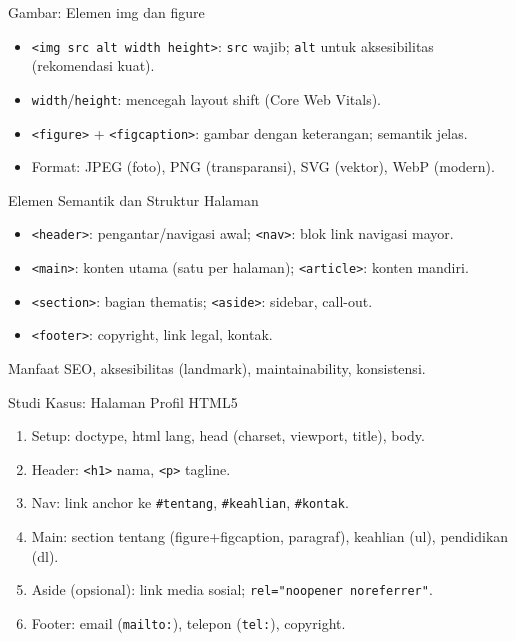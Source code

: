 \documentclass[handout]{beamer}
\begin{document}
\begin{frame}{Gambar: Elemen img dan figure}
	\begin{itemize}
		\item \texttt{<img src alt width height>}: \texttt{src} wajib; \texttt{alt} untuk aksesibilitas (rekomendasi kuat).
		\item \texttt{width}/\texttt{height}: mencegah layout shift (Core Web Vitals).
		\item \texttt{<figure>} + \texttt{<figcaption>}: gambar dengan keterangan; semantik jelas.
		\item Format: JPEG (foto), PNG (transparansi), SVG (vektor), WebP (modern).
	\end{itemize}
\end{frame}

\begin{frame}{Elemen Semantik dan Struktur Halaman}
	\begin{itemize}
		\item \texttt{<header>}: pengantar/navigasi awal; \texttt{<nav>}: blok link navigasi mayor.
		\item \texttt{<main>}: konten utama (satu per halaman); \texttt{<article>}: konten mandiri.
		\item \texttt{<section>}: bagian thematis; \texttt{<aside>}: sidebar, call-out.
		\item \texttt{<footer>}: copyright, link legal, kontak.
	\end{itemize}
	\begin{block}{Manfaat}
		SEO, aksesibilitas (landmark), maintainability, konsistensi.
	\end{block}
\end{frame}

\begin{frame}{Studi Kasus: Halaman Profil HTML5}
	\begin{enumerate}
		\item Setup: doctype, html lang, head (charset, viewport, title), body.
		\item Header: \texttt{<h1>} nama, \texttt{<p>} tagline.
		\item Nav: link anchor ke \texttt{\#tentang}, \texttt{\#keahlian}, \texttt{\#kontak}.
		\item Main: section tentang (figure+figcaption, paragraf), keahlian (ul), pendidikan (dl).
		\item Aside (opsional): link media sosial; \texttt{rel="noopener noreferrer"}.
		\item Footer: email (\texttt{mailto:}), telepon (\texttt{tel:}), copyright.
	\end{enumerate}
\end{frame}
\end{document}
